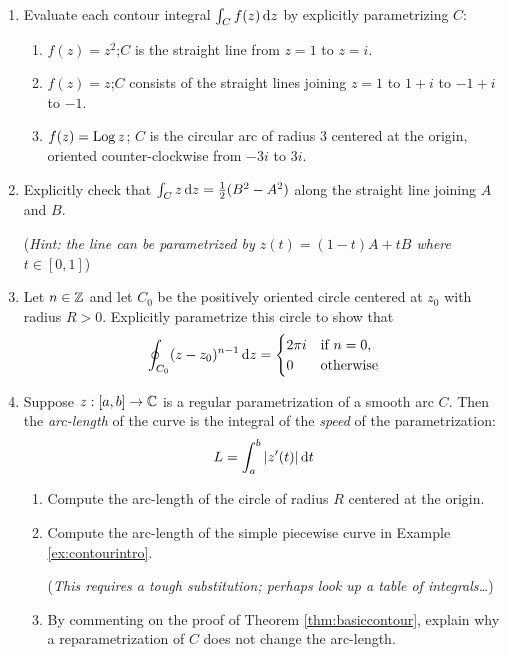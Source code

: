 \begin{exercises}
\begin{enumerate}
	  
	  \item Evaluate each contour integral $\int_Cf(z)\,{\mathrm{d} z}$ by explicitly parametrizing $C$:
		\begin{enumerate}
	    \item $f(z)=z^2$;\quad $C$ is the straight line from $z=1$ to $z=i$.
	    \item $f(z)=z$;\quad $C$ consists of the straight lines joining $z=1$ to $1+i$ to $-1+i$ to $-1$.
	    \item $f(z)=\operatorname{Log} z$; $C$ is the circular arc of radius 3 centered at the origin, oriented counter-clockwise from $-3i$ to $3i$.
		\end{enumerate}
		
		
		\item Explicitly check that $\int_Cz\,{\mathrm{d} z}=\frac 12(B^2-A^2)$ along the straight line joining $A$ and $B$.\par
		(\emph{Hint: the line can be parametrized by $z(t)=(1-t)A+tB$ where $t\in[0,1]$})
		
		
		\item\label{ex:intpowers} Let $n\in \mathbb{Z}$ and let $C_0$ be the positively oriented circle centered at $z_0$ with radius $R>0$. Explicitly parametrize this circle to show that
		\[
			\oint_{C_0}(z-z_0)^{n-1}\,{\mathrm{d} z}=
			\begin{cases}
				2\pi i&\text{if $n=0$,}\\
				0&\text{otherwise}
			\end{cases}
		\]
		
	
	  \item Suppose $z:[a,b]\to\mathbb{C}$ is a regular parametrization of a smooth arc $C$. Then the \emph{arc-length} of the curve is the integral of the \emph{speed} of the parametrization:
	  \[
	  	L=\int_a^{b}\left| z'(t)\right|{\mathrm{d} t}
	  \]
	  \begin{enumerate}
	    \item Compute the arc-length of the circle of radius $R$ centered at the origin.
	    
	    \item Compute the arc-length of the simple piecewise curve in Example \ref{ex:contourintro}.\par
	    (\emph{This requires a tough substitution; perhaps look up a table of integrals\ldots})
	    
	    \item By commenting on the proof of Theorem \ref{thm:basiccontour}, explain why a reparametrization of $C$ does not change the arc-length.
	    

\end{enumerate}
\end{enumerate}
\end{exercises}
